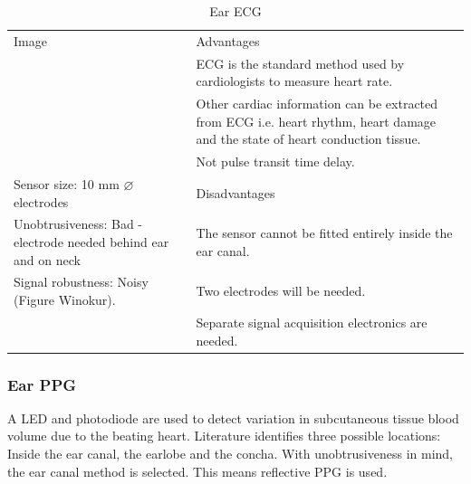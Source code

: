 \begin{table}[H]
\caption{Ear ECG}
\label{tab:EarECG_Eval}
\renewcommand{\arraystretch}{1.3}	%
\centering
\begin{tabular}{|p{5cm}|p{8cm}|} 
 \hline
 Image 						& 	Advantages  \\ 
  							&	\tabitem ECG is the standard method used by cardiologists to measure heart rate.\\
  							&	\tabitem Other cardiac information can be extracted from ECG i.e. heart rhythm, heart damage and the state of heart conduction tissue.\\
  							&	\tabitem Not pulse transit time delay.\\
\hline
Sensor size: 10 mm  ${\diameter}$ electrodes					&	Disadvantages  \\ 
Unobtrusiveness: Bad - electrode needed behind ear and on neck 	&	\tabitem The sensor cannot be fitted entirely inside the ear canal.\\
Signal robustness: Noisy (Figure Winokur). 						&	\tabitem Two electrodes will be needed.\\
  																&	\tabitem Separate signal acquisition electronics are needed.\\
 
 \hline
\end{tabular}
\end{table}

\subsubsection{Ear PPG}
A LED and photodiode are used to detect variation in subcutaneous tissue blood volume due to the beating heart. Literature identifies three possible locations: Inside the ear canal, the earlobe and the concha. With unobtrusiveness in mind, the ear canal method is selected. This means reflective PPG is used.

